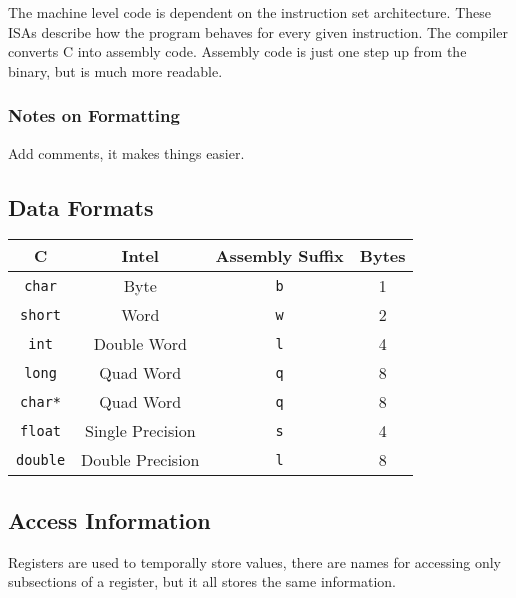 \documentclass[10pt]{armath}
\newcommand{\s}[1]{\texttt{#1}}
\begin{document}
The machine level code is dependent on the instruction set architecture. These
ISAs describe how the program behaves for every given instruction. The compiler
converts C into assembly code. Assembly code is just one step up from the
binary, but is much more readable.

\subsubsection{Notes on Formatting}%
\label{ssub:notes_on_formatting}

Add comments, it makes things easier.

\subsection{Data Formats}%
\label{sub:data_formats}

\begin{center}
  \begin{tabular}{c c c c}
    C & Intel & Assembly Suffix & Bytes\\
    \hline
    \s{char} & Byte & \s{b} & 1\\
    \s{short} & Word & \s{w} & 2\\
    \s{int} & Double Word & \s{l} & 4\\
    \s{long} & Quad Word & \s{q} & 8\\
    \s{char*} & Quad Word & \s{q} & 8\\
    \s{float} & Single Precision & \s{s} & 4\\
    \s{double} & Double Precision & \s{l} & 8\\
    \hline
  \end{tabular}
\end{center}

\subsection{Access Information}%
\label{sub:access_information}

Registers are used to temporally store values, there are names for accessing
only subsections of a register, but it all stores the same information.
\end{document}
